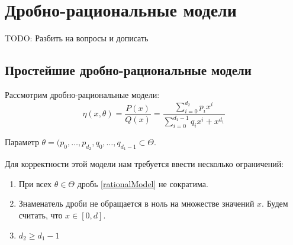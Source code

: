 \section{Дробно-рациональные модели}

{\color{blue} TODO: Разбить на вопросы и дописать}
\subsection{Простейшие дробно-рациональные модели}
Рассмотрим дробно-рациональные модели:
\begin{equation}
\label{rationalModel}
\eta(x, \theta) = \frac{P(x)}{Q(x)} = \frac{\sum\limits_{i=0}^{d_2}p_ix^i}{\sum\limits_{i=0}^{d_1-1}q_ix^i + x^{d_1}}
\end{equation}

Параметр $\theta = (p_0, …, p_{d_2}, q_0, …, q_{d_1-1}\subset \Theta$.

Для корректности этой модели нам требуется ввести несколько ограничений:
\begin{enumerate}
\item При всех $\theta \in \Theta$ дробь \eqref{rationalModel} не сократима. 
\item Знаменатель дроби не обращается в ноль на множестве значений $x$. Будем считать, что $x \in [0,d]$. 
\item $d_2 \geq d_1 - 1$
\end{enumerate}


